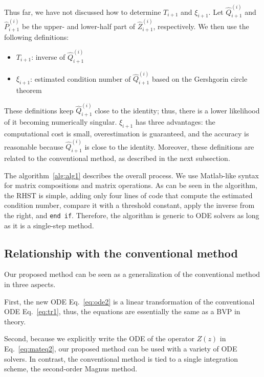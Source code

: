 \documentclass[preprint, 5p, times, sort&compress]{elsarticle}
\begin{document}
        Thus far, we have not discussed how to determine $T_{i+1}$ and $\xi_{i+1}$.
        Let $\hat{Q}_{i+1}^{(i)}$ and $\hat{P}_{i+1}^{(i)}$ be the upper- and lower-half part of
        $\hat{Z}_{i+1}^{(i)}$, respectively.
        We then use the following definitions:
        \begin{itemize}
                \item $T_{i+1}$: inverse of $\hat{Q}_{i+1}^{(i)}$
                \item $\xi_{i+1}$: estimated condition number of $\hat{Q}_{i+1}^{(i)}$ based on the Gershgorin circle theorem
        \end{itemize}
        These definitions keep $\hat{Q}_{i+1}^{(i)}$ close to the identity;
        thus, there is a lower likelihood of it becoming numerically singular.
        $\xi_{i+1}$ has three advantages:
        the computational cost is small,
        overestimation is guaranteed,
        and the accuracy is reasonable because
        $\hat{Q}_{i+1}^{(i)}$ is close to the identity.
        Moreover, these definitions are related to the conventional method,
        as described in the next subsection.

        The algorithm~\ref{alg:alg1} describes the overall process.
        We use Matlab-like syntax for matrix compositions and matrix operations.
        As can be seen in the algorithm, the RHST is simple, adding only four lines of code
        that compute the estimated condition number, compare it with a threshold constant,
        apply the inverse from the right, and \texttt{end if}.
        Therefore, the algorithm is generic to ODE solvers as long as it is a single-step method.

        \subsection{Relationship with the conventional method}
        Our proposed method can be seen as a generalization of the conventional method in three aspects.

        First, the new ODE Eq.~\eqref{eq:ode2} is a linear transformation of the conventional ODE Eq.~\eqref{eq:tr1},
        thus, the equations are essentially the same as a BVP in theory.

        Second, because we explicitly write the ODE of the operator $Z(z)$ in Eq.~\eqref{eq:mateq2},
        our proposed method can be used with a variety of ODE solvers.
        In contrast, the conventional method is tied to a single integration scheme, the second-order Magnus method.
\end{document}
